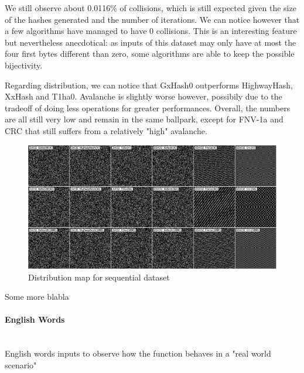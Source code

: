 \documentclass[10pt]{article}
\begin{document}
We still observe about 0.0116\% of collisions, which is still expected given the size of the hashes generated and the number of iterations. We can notice however that a few algorithms have managed to have 0 collisions. This is an interesting feature but nevertheless anecdotical: as inputs of this dataset may only have at most the four first bytes different than zero, some algorithms are able to keep the possible bijectivity.

Regarding distribution, we can notice that GxHash0 outperforms HighwayHash, XxHash and T1ha0. Avalanche is slightly worse however, possibily due to the tradeoff of doing less operations for greater performances. Overall, the numbers are all still very low and remain in the same ballpark, except for FNV-1a and CRC that still suffers from a relatively "high" avalanche.

\begin{figure}[H]
\centering
\includegraphics[width=1\textwidth]{quality-sequential.png}
\caption{Distribution map for sequential dataset}
\label{fig:quality-sequential}
\end{figure}

Some more blabla

\clearpage
\paragraph{English Words}\leavevmode\\
English words inputs to observe how the function behaves in a "real world scenario"
\end{document}
